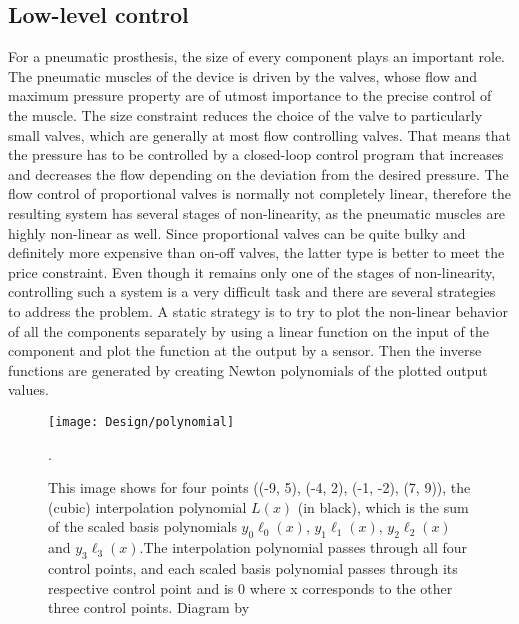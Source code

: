 \documentclass[main]{subfiles}
\begin{document}
\subsection{Low-level control}

For a pneumatic prosthesis, the size of every component plays an important role. The pneumatic muscles of the device is driven by the valves, whose flow and maximum pressure property are of utmost importance to the precise control of the muscle. The size constraint reduces the choice of the valve to particularly small valves, which are generally at most flow controlling valves. That means that the pressure has to be controlled by a closed-loop control program that increases and decreases the flow depending on the deviation from the desired pressure. The flow control of proportional valves is normally not completely linear, therefore the resulting system has several stages of non-linearity, as the pneumatic muscles are highly non-linear as well. Since proportional valves can be quite bulky and definitely more expensive than on-off valves, the latter type is better to meet the price constraint. Even though it remains only one of the stages of non-linearity, controlling such a system is a very difficult task and there are several strategies to address the problem. A static strategy is to try to plot the non-linear behavior of all the components separately by using a linear function on the input of the component and plot the function at the output by a sensor. Then the inverse functions are generated by creating Newton polynomials of the plotted output values.

\begin{figure}[htp]
\centering
\texttt{[image: Design/polynomial]}
\caption[Concept of an interpolation based on polynomials]{This image shows for four points ((-9, 5), (-4, 2), (-1, -2), (7, 9)), the (cubic) interpolation polynomial $L(x)$ (in black), which is the sum of the scaled basis polynomials $y_0\ell_0(x)$, $y_1\ell_1(x)$, $y_2\ell_2(x)$ and $y_3\ell_3(x)$.The interpolation polynomial passes through all four control points, and each scaled basis polynomial passes through its respective control point and is 0 where x corresponds to the other three control points. Diagram by \cite{Polynomial}}.
\label{polynomial}
\end{figure}
\end{document}
